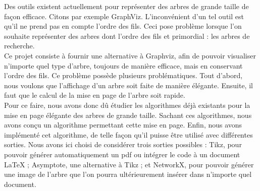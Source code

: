Des outils existent actuellement pour représenter des arbres de grande taille de façon efficace. Citons par exemple GraphViz. L'inconvénient d'un tel outil est qu'il ne prend pas en compte l'ordre des fils. Ceci pose problème lorsque l'on souhaite représenter des arbres dont l'ordre des fils et primordial : les arbres de recherche.\\
Ce projet consiste à fournir une alternative à Graphviz, afin de pouvoir visualiser n'importe quel type d'arbre, toujours de manière efficace, mais en conservant l'ordre des fils. Ce problème possède plusieurs problématiques. Tout d'abord, nous voulons que l'affichage d'un arbre soit faite de manière élégante. Ensuite, il faut que le calcul de la mise en page de l'arbre soit rapide.\\
Pour ce faire, nous avons donc d\^u étudier les algorithmes déjà existants pour la mise en page élégante des arbres de grande taille. Sachant ces algorithmes, nous avons conçu un algorithme permettant cette mise en page. Enfin, nous avons implémenté cet algorithme, de telle façon qu'il puisse \^etre utilisé avec différentes sorties. Nous avons ici choisi de considérer trois sorties possibles : Tikz, pour pouvoir générer automatiquement un pdf ou intégrer le code à un document LaTeX ; Asymptote, une alternative à Tikz ; et NetworkX, pour pouvoir générer une image de l'arbre que l'on pourra ultérieurement insérer dans n'importe quel document.
